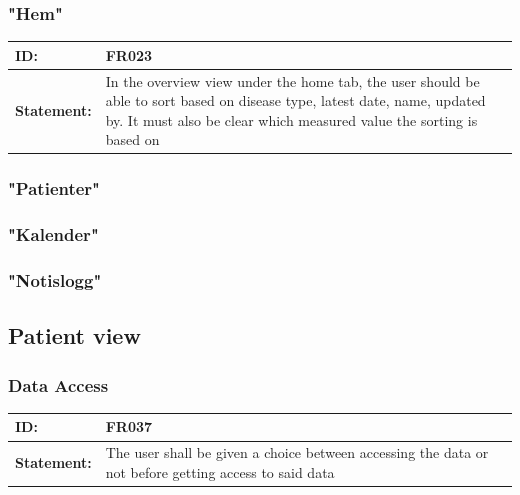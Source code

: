 \documentclass{scrreprt}
\begin{document}
\subsubsection{"Hem"}

\begin{tabularx}{\linewidth}{| l | X |}
 \hline
 \textbf{ID:} & FR023  \\ 
 \hline
 \textbf{Statement:} & In the overview view under the home tab, the user should be able to sort based on disease type, latest date, name, updated by. It must also be clear which measured value the sorting is based on
 \\ 
 \hline
\end{tabularx}

\subsubsection{"Patienter"}
\subsubsection{"Kalender"}
\subsubsection{"Notislogg"}

\subsection{Patient view} 
\subsubsection{Data Access}
\begin{center}

\begin{tabularx}{\linewidth}{| l | X |}
 \hline
 \textbf{ID:} & FR037  \\ 
 \hline
 \textbf{Statement:} & The user shall be given a choice between accessing the data or not before getting access to said data
 \\ 
 \hline
\end{tabularx}
\end{center}
\end{document}
